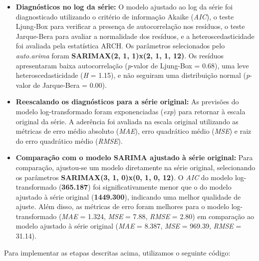 \documentclass[a4paper, 12pt]{article}
\begin{document}
\begin{itemize}
    \item \textbf{Diagnósticos no log da série:} O modelo ajustado ao log da série foi diagnosticado utilizando o critério de informação Akaike (\textit{AIC}), o teste Ljung-Box para verificar a presença de autocorrelação nos resíduos, o teste Jarque-Bera para avaliar a normalidade dos resíduos, e a heteroscedasticidade foi avaliada pela estatística ARCH. Os parâmetros selecionados pelo \textit{auto.arima} foram \textbf{SARIMAX(2, 1, 1)x(2, 1, 1, 12)}. Os resíduos apresentaram baixa autocorrelação (\textit{p}-valor de Ljung-Box = 0.68), uma leve heteroscedasticidade (\textit{H} = 1.15), e não seguiram uma distribuição normal (\textit{p}-valor de Jarque-Bera = 0.00).

    \item \textbf{Reescalando os diagnósticos para a série original:} As previsões do modelo log-transformado foram exponenciadas (\textit{exp}) para retornar à escala original da série. A aderência foi avaliada na escala original utilizando as métricas de erro médio absoluto (\textit{MAE}), erro quadrático médio (\textit{MSE}) e raiz do erro quadrático médio (\textit{RMSE}).

    \item \textbf{Comparação com o modelo SARIMA ajustado à série original:} Para comparação, ajustou-se um modelo diretamente na série original, selecionando os parâmetros \textbf{SARIMAX(3, 1, 0)x(0, 1, 0, 12)}. O \textit{AIC} do modelo log-transformado (\textbf{365.187}) foi significativamente menor que o do modelo ajustado à série original (\textbf{1449.300}), indicando uma melhor qualidade de ajuste. Além disso, as métricas de erro foram melhores para o modelo log-transformado (\textit{MAE} = 1.324, \textit{MSE} = 7.88, \textit{RMSE} = 2.80) em comparação ao modelo ajustado à série original (\textit{MAE} = 8.387, \textit{MSE} = 969.39, \textit{RMSE} = 31.14).
\end{itemize}

Para implementar as etapas descritas acima, utilizamos o seguinte código:
\end{document}

